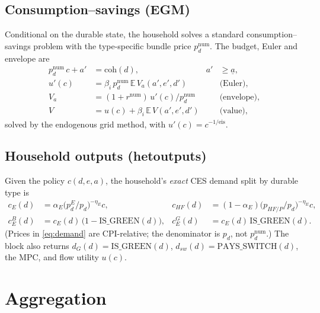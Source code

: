\documentclass[11pt]{article}
\newcommand{\E}{\mathbb{E}}
\newcommand{\num}{\mathrm{num}}
\newcommand{\pE}{p^{E}}
\newcommand{\coh}{\mathrm{coh}}
\begin{document}
\subsection{Consumption--savings (EGM)}

Conditional on the durable state, the household solves a standard
consumption--savings problem with the type-specific bundle price $p_d^{\num}$.
The budget, Euler and envelope are
\begin{align}
p_d^{\num}\,c + a' &= \coh(d), & a'&\ge \underline a, \label{eq:budget}\\
u'(c) &= \beta_i\,p_d^{\num}\,\E\,V_a(a',e',d') & &\text{(Euler)},\\
V_a &= (1+r^{\num})\,u'(c)/p_d^{\num} & &\text{(envelope)},\\
V &= u(c)+\beta_i\,\E\,V(a',e',d') & &\text{(value)},
\end{align}
solved by the endogenous grid method, with $u'(c)=c^{-1/\text{eis}}$.

\subsection{Household outputs (hetoutputs)}\label{sec:hetout}

Given the policy $c(d,e,a)$, the household's \emph{exact} CES demand split by
durable type is
\begin{align}
c_E(d) &= \alpha_E\bigl(\pE_d/p_d\bigr)^{-\eta_E} c, &
c_{HF}(d) &= (1-\alpha_E)\bigl(p_{HF/P}/p_d\bigr)^{-\eta_E} c, \label{eq:demand}\\
c_E^{B}(d) &= c_E(d)\,\bigl(1-\mathrm{IS\_GREEN}(d)\bigr), &
c_E^{G}(d) &= c_E(d)\,\mathrm{IS\_GREEN}(d).
\end{align}
(Prices in \eqref{eq:demand} are CPI-relative; the denominator is $p_d$, not
$p_d^{\num}$.) The block also returns $d_G(d)=\mathrm{IS\_GREEN}(d)$,
$d_{sw}(d)=\mathrm{PAYS\_SWITCH}(d)$, the MPC, and flow utility $u(c)$.

\section{Aggregation}\label{sec:agg}
\end{document}
